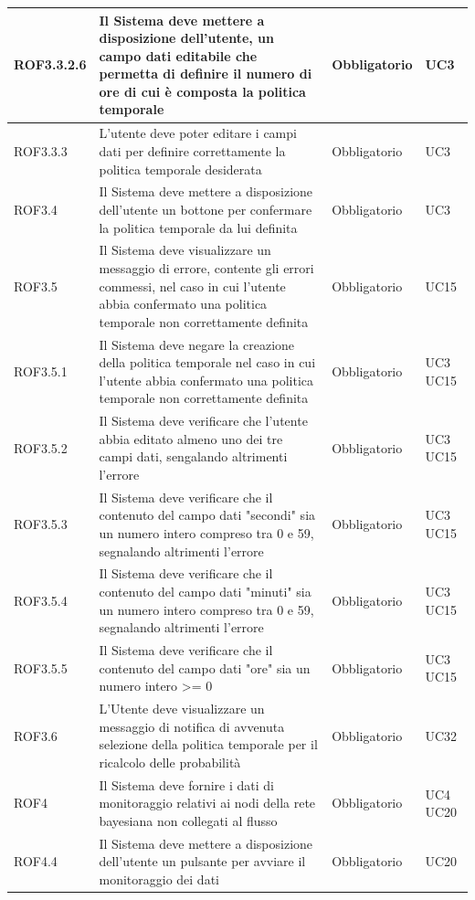 \begin{center}
\begin{longtable}[c]{|m{}|m{}|m{}|m{}|}
\hline
\rowcolor{grigio}ROF3.3.2.6 & Il Sistema deve mettere a disposizione dell'utente, un campo dati editabile che permetta di definire il numero di ore di cui è composta la politica temporale & Obbligatorio & UC3\\
\hline
ROF3.3.3 & L'utente deve poter editare i campi dati per definire correttamente la politica temporale desiderata & Obbligatorio & UC3\\
\hline
\rowcolor{grigio}ROF3.4 & Il Sistema deve mettere a disposizione dell'utente un bottone per confermare la politica temporale da lui definita & Obbligatorio & UC3\\
\hline
ROF3.5 & Il Sistema deve visualizzare un messaggio di errore, contente gli errori commessi, nel caso in cui l'utente abbia confermato una politica temporale non correttamente definita & Obbligatorio & UC15\\
\hline
\rowcolor{grigio}ROF3.5.1 & Il Sistema deve negare la creazione della politica temporale nel caso in cui l'utente abbia confermato una politica temporale non correttamente definita & Obbligatorio & UC3 UC15 \\
\hline
ROF3.5.2 & Il Sistema deve verificare che l'utente abbia editato almeno uno dei tre campi dati, sengalando altrimenti l'errore & Obbligatorio & UC3 UC15\\
\hline
\rowcolor{grigio}ROF3.5.3 & Il Sistema deve verificare che il contenuto del campo dati "secondi" sia un numero intero compreso tra 0 e 59, segnalando altrimenti l'errore & Obbligatorio & UC3 UC15\\
\hline
ROF3.5.4 & Il Sistema deve verificare che il contenuto del campo dati "minuti" sia un numero intero compreso tra 0 e 59, segnalando altrimenti l'errore & Obbligatorio & UC3 UC15\\
\hline
\rowcolor{grigio}ROF3.5.5 & Il Sistema deve verificare che il contenuto del campo dati "ore" sia un numero intero >= 0 & Obbligatorio & UC3 UC15\\
\hline
ROF3.6 & L'Utente deve visualizzare un messaggio di notifica di avvenuta selezione della politica temporale per il ricalcolo delle probabilità & Obbligatorio & UC32\\
\hline
\rowcolor{grigio}ROF4 & Il Sistema deve fornire i dati di monitoraggio relativi ai nodi della rete bayesiana non collegati al flusso & Obbligatorio & UC4 UC20\\
\hline
ROF4.4 & Il Sistema deve mettere a disposizione dell'utente un pulsante per avviare il monitoraggio dei dati & Obbligatorio & UC20\\

\end{longtable}
\end{center}
